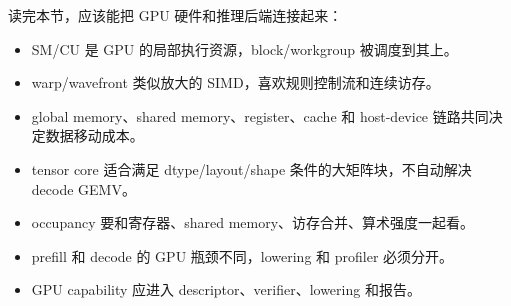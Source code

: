 读完本节，应该能把 GPU 硬件和推理后端连接起来：

\begin{itemize}
  \item SM/CU 是 GPU 的局部执行资源，block/workgroup 被调度到其上。
  \item warp/wavefront 类似放大的 SIMD，喜欢规则控制流和连续访存。
  \item global memory、shared memory、register、cache 和 host-device 链路共同决定数据移动成本。
  \item tensor core 适合满足 dtype/layout/shape 条件的大矩阵块，不自动解决 decode GEMV。
  \item occupancy 要和寄存器、shared memory、访存合并、算术强度一起看。
  \item prefill 和 decode 的 GPU 瓶颈不同，lowering 和 profiler 必须分开。
  \item GPU capability 应进入 descriptor、verifier、lowering 和报告。
\end{itemize}
